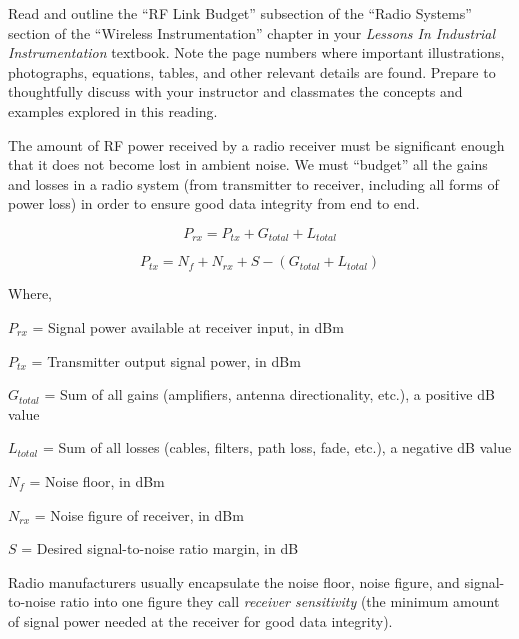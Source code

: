 

Read and outline the ``RF Link Budget'' subsection of the ``Radio Systems'' section of the ``Wireless Instrumentation'' chapter in your {\it Lessons In Industrial Instrumentation} textbook.  Note the page numbers where important illustrations, photographs, equations, tables, and other relevant details are found.  Prepare to thoughtfully discuss with your instructor and classmates the concepts and examples explored in this reading.














The amount of RF power received by a radio receiver must be significant enough that it does not become lost in ambient noise.  We must ``budget'' all the gains and losses in a radio system (from transmitter to receiver, including all forms of power loss) in order to ensure good data integrity from end to end.

$$P_{rx} = P_{tx} + G_{total} + L_{total}$$

$$P_{tx} = N_f + N_{rx} + S - (G_{total} + L_{total})$$

\noindent
Where,

$P_{rx}$ = Signal power available at receiver input, in dBm

$P_{tx}$ = Transmitter output signal power, in dBm

$G_{total}$ = Sum of all gains (amplifiers, antenna directionality, etc.), a positive dB value

$L_{total}$ = Sum of all losses (cables, filters, path loss, fade, etc.), a negative dB value

$N_f$ = Noise floor, in dBm

$N_{rx}$ = Noise figure of receiver, in dBm

$S$ = Desired signal-to-noise ratio margin, in dB

\vskip 10pt

Radio manufacturers usually encapsulate the noise floor, noise figure, and signal-to-noise ratio into one figure they call {\it receiver sensitivity} (the minimum amount of signal power needed at the receiver for good data integrity).

